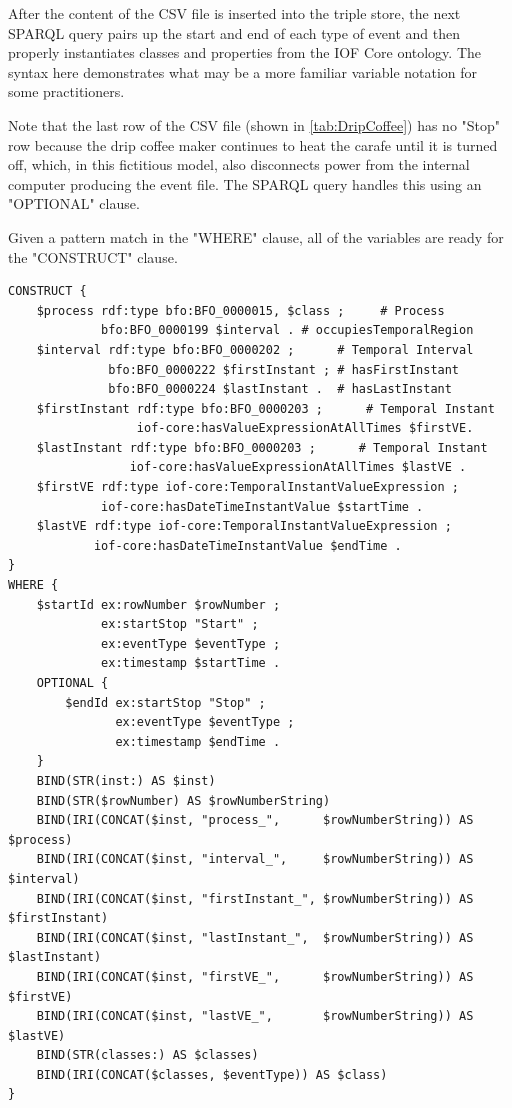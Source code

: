 After the content of the CSV file is inserted into the triple store, the next SPARQL query pairs up the start and end of each type of event and then properly instantiates classes and properties from the IOF Core ontology. The syntax here demonstrates what may be a more familiar variable notation for some practitioners.

Note that the last row of the CSV file (shown in \ref{tab:DripCoffee}) has no "Stop" row because the drip coffee maker continues to heat the carafe until it is turned off, which, in this fictitious model, also disconnects power from the internal computer producing the event file. The SPARQL query handles this using an "OPTIONAL" clause.

Given a pattern match in the "WHERE" clause, all of the variables are ready for the "CONSTRUCT" clause.

% 

\begin{verbatim}
CONSTRUCT {
    $process rdf:type bfo:BFO_0000015, $class ;     # Process            
             bfo:BFO_0000199 $interval . # occupiesTemporalRegion
    $interval rdf:type bfo:BFO_0000202 ;      # Temporal Interval
              bfo:BFO_0000222 $firstInstant ; # hasFirstInstant
              bfo:BFO_0000224 $lastInstant .  # hasLastInstant
    $firstInstant rdf:type bfo:BFO_0000203 ;      # Temporal Instant
                  iof-core:hasValueExpressionAtAllTimes $firstVE.
    $lastInstant rdf:type bfo:BFO_0000203 ;      # Temporal Instant
                 iof-core:hasValueExpressionAtAllTimes $lastVE .
    $firstVE rdf:type iof-core:TemporalInstantValueExpression ;
             iof-core:hasDateTimeInstantValue $startTime .
    $lastVE rdf:type iof-core:TemporalInstantValueExpression ;
            iof-core:hasDateTimeInstantValue $endTime .
}
WHERE {
    $startId ex:rowNumber $rowNumber ;
             ex:startStop "Start" ;
             ex:eventType $eventType ;
             ex:timestamp $startTime .
    OPTIONAL {
        $endId ex:startStop "Stop" ;
               ex:eventType $eventType ;
               ex:timestamp $endTime .
    }
    BIND(STR(inst:) AS $inst)
    BIND(STR($rowNumber) AS $rowNumberString)
    BIND(IRI(CONCAT($inst, "process_",      $rowNumberString)) AS $process)
    BIND(IRI(CONCAT($inst, "interval_",     $rowNumberString)) AS $interval)
    BIND(IRI(CONCAT($inst, "firstInstant_", $rowNumberString)) AS $firstInstant)
    BIND(IRI(CONCAT($inst, "lastInstant_",  $rowNumberString)) AS $lastInstant)
    BIND(IRI(CONCAT($inst, "firstVE_",      $rowNumberString)) AS $firstVE)
    BIND(IRI(CONCAT($inst, "lastVE_",       $rowNumberString)) AS $lastVE)
    BIND(STR(classes:) AS $classes)
    BIND(IRI(CONCAT($classes, $eventType)) AS $class)
}
\end{verbatim}




